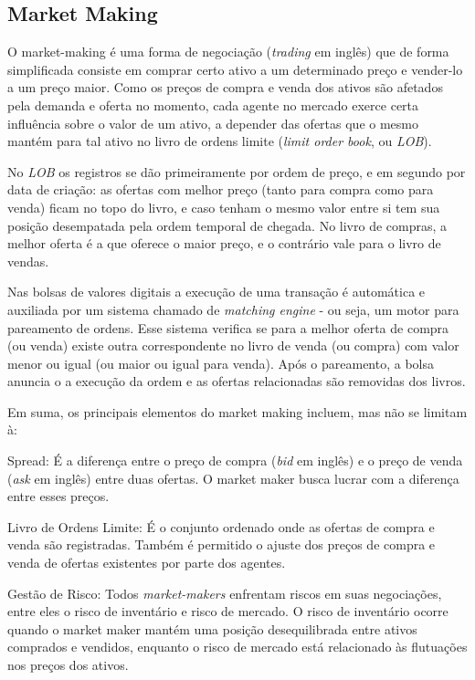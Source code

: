 \subsection{Market Making}
O market-making é uma forma de negociação (\textit{trading} em inglês)  que de forma simplificada consiste em comprar certo ativo a um determinado preço e vender-lo a um preço maior.
Como os preços de compra e venda dos ativos são afetados pela demanda e oferta no momento, cada agente no mercado exerce certa influência sobre o valor de um ativo, a depender das ofertas que o mesmo mantém para tal ativo no livro de ordens limite (\textit{limit order book}, ou \textit{LOB}). 

No \textit{LOB} os registros se dão primeiramente por ordem de preço, e em segundo por data de criação: as ofertas com melhor preço (tanto para compra como para venda) ficam no topo do livro, e caso tenham o mesmo valor entre si tem sua posição desempatada pela ordem temporal de chegada. No livro de compras, a melhor oferta é a que oferece o maior preço, e o contrário vale para o livro de vendas.

Nas bolsas de valores digitais a execução de uma transação é automática e auxiliada por um sistema chamado de \textit{matching engine} - ou seja, um motor para pareamento de ordens. Esse sistema verifica se para a melhor oferta de compra (ou venda) existe outra correspondente no livro de venda (ou compra) com valor menor ou igual (ou maior ou igual para venda). Após o pareamento, a bolsa anuncia o a execução da ordem e as ofertas relacionadas são removidas dos livros.

Em suma, os principais elementos do market making incluem, mas não se limitam à:

Spread: É a diferença entre o preço de compra (\textit{bid} em inglês) e o preço de venda (\textit{ask} em inglês) entre duas ofertas. O market maker busca lucrar com a diferença entre esses preços.

Livro de Ordens Limite: É o conjunto ordenado onde as ofertas de compra e venda são registradas. Também é permitido o ajuste dos preços de compra e venda de ofertas existentes por parte dos agentes.

Gestão de Risco: Todos \textit{market-makers} enfrentam riscos em suas negociações, entre eles o risco de inventário e risco de mercado. O risco de inventário ocorre quando o market maker mantém uma posição desequilibrada entre ativos comprados e vendidos, enquanto o risco de mercado está relacionado às flutuações nos preços dos ativos.

